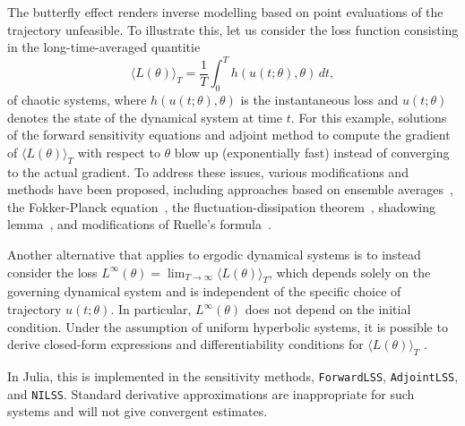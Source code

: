 The butterfly effect renders inverse modelling based on point evaluations of the trajectory unfeasible. 
To illustrate this, let us consider the loss function consisting in the long-time-averaged quantitie 
\begin{equation}\label{eq:long_time_averaged_quantities}
    \langle L(\theta) \rangle_T = \frac{1}{T} \int_0^T h(u(t; \theta), \theta) \, dt, 
\end{equation}
of chaotic systems, where $h(u(t; \theta), \theta)$ is the instantaneous loss and $u(t; \theta)$ denotes the state of the dynamical system at time $t$.
For this example, solutions of the forward sensitivity equations and adjoint method to compute the gradient of $\langle L(\theta) \rangle_T$ with respect to $\theta$ blow up (exponentially fast) instead of converging to the actual gradient.
To address these issues, various modifications and methods have been proposed, including approaches based on ensemble averages~\cite{lea2000sensitivity, eyink2004ruelle}, the Fokker-Planck equation~\cite{thuburn2005climate, blonigan2014probability}, the fluctuation-dissipation theorem~\cite{leith1975climate, abramov2007blended, abramov2008new}, shadowing lemma~\cite{wang2013forward, wang2014least, wang2014convergence, ni2017sensitivity, blonigan2017adjoint, blonigan2018multiple, ni2019adjoint, ni2019sensitivity}, and modifications of Ruelle's formula~\cite{chandramoorthy2022efficient, ni2020fast}.

Another alternative that applies to ergodic dynamical systems is to instead consider the loss $L^\infty(\theta) = \lim_{T\to\infty} \langle L(\theta) \rangle_T$, which depends solely on the governing dynamical system and is independent of the specific choice of trajectory $u(t; \theta)$. 
In particular, $L^\infty(\theta)$ does not depend on the initial condition. 
Under the assumption of uniform hyperbolic systems, it is possible to derive closed-form expressions and differentiability conditions for $ \langle L(\theta) \rangle_T$ \cite{ruelle1997differentiation,ruelle2009review}.

In Julia, this is implemented in the sensitivity methods, \texttt{ForwardLSS},  \texttt{AdjointLSS}, and \texttt{NILSS}. %
Standard derivative approximations are inappropriate for such systems and will not give convergent estimates.
